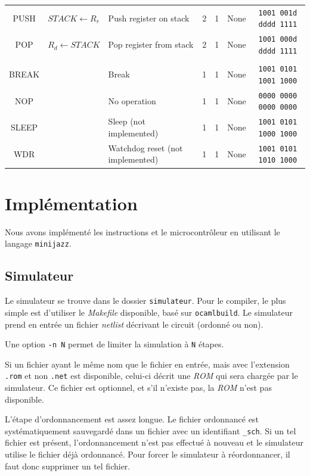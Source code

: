 \documentclass[11pt]{article}
\begin{document}
\begin{center}
\begin{longtable}{|c|m{10em}|l|c|c|c|c|}
PUSH & $STACK \leftarrow R_r$ & Push register on stack & 2 & 1 & None & \texttt{1001 001d dddd 1111}\\
POP & $R_d \leftarrow STACK$ & Pop register from stack & 2 & 1 & None & \texttt{1001 000d dddd 1111}\\
\hline\hline
 \rowcolor{gray!10}
\multicolumn{7}{|c|}{Autre} \\
\hline
BREAK &  &  Break & 1 & 1 & None & \texttt{1001 0101 1001 1000}\\
NOP &  &  No operation & 1 & 1 & None & \texttt{0000 0000 0000 0000}\\
SLEEP &  & Sleep (not implemented) & 1 & 1 & None & \texttt{1001 0101 1000 1000}\\
WDR &  & Watchdog reset (not implemented) & 1 & 1 & None & \texttt{1001 0101 1010 1000}\\
\hline
\end{longtable}
\end{center}

\pagebreak
\normalsize
\section{Implémentation}

Nous avons implémenté les instructions et le microcontrôleur en utilisant le langage \texttt{minijazz}.

\subsection{Simulateur}

Le simulateur se trouve dans le dossier \texttt{simulateur}. Pour le compiler, le plus simple est d'utiliser le \emph{Makefile} disponible, basé sur \texttt{ocamlbuild}. Le simulateur prend en entrée un fichier \emph{netlist} décrivant le circuit (ordonné ou non).

Une option \texttt{-n N} permet de limiter la simulation à \texttt{N} étapes.

Si un fichier ayant le même nom que le fichier en entrée, mais avec l'extension \texttt{.rom} et non \texttt{.net} est disponible, celui-ci décrit une \emph{ROM} qui sera chargée par le simulateur. Ce fichier est optionnel, et s'il n'existe pas, la \emph{ROM} n'est pas disponible.

L'étape d'ordonnancement est assez longue. Le fichier ordonnancé est systématiquement sauvegardé dans un fichier avec un identifiant \texttt{\_sch}. Si un tel fichier est présent, l'ordonnancement n'est pas effectué à nouveau et le simulateur utilise le fichier déjà ordonnancé. Pour forcer le simulateur à réordonnancer, il faut donc supprimer un tel fichier.
\end{document}

